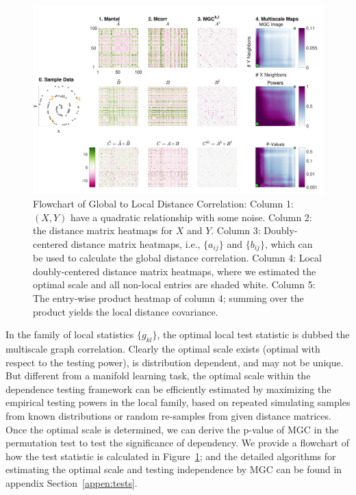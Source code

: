 \documentclass[11pt]{article}
\begin{document}
\begin{figure}[htbp]
\includegraphics[width=1.0\textwidth]{../Figures/FigA}
\caption{
Flowchart of Global to Local Distance Correlation: Column 1: $(X,Y)$ have a quadratic relationship with some noise. Column 2: the distance matrix heatmaps for $X$ and $Y$. Column 3: Doubly-centered distance matrix heatmaps, i.e., $\{a_{ij}\}$ and $\{b_{ij}\}$, which can be used to calculate the global distance correlation. Column 4: Local doubly-centered distance matrix heatmaps, where we estimated the optimal scale and all non-local entries are shaded white. Column 5: The entry-wise product heatmap of column 4; summing over the product yields the local distance covariance. }
\label{fig:A}
\end{figure}

In the family of local statistics $\{g_{kl}\}$, the optimal local test statistic is dubbed the multiscale graph correlation. Clearly the optimal scale exists (optimal with respect to the testing power), is distribution dependent, and may not be unique. But different from a manifold learning task, the optimal scale within the dependence testing framework can be efficiently estimated by maximizing the empirical testing powers in the local family, based on repeated simulating samples from known distributions or random re-samples from given distance matrices. Once the optimal scale is determined, we can derive the p-value of MGC in the permutation test to test the significance of dependency. We provide a flowchart of how the test statistic is calculated in Figure~\ref{fig:A}; and the detailed algorithms for estimating the optimal scale and testing independence by MGC can be found in appendix Section~\ref{appen:tests}.
\end{document}
